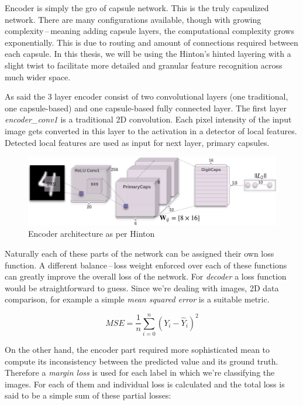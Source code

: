 Encoder is simply the gro of capsule network. This is the truly capsulized network. There are many configurations available, though with growing complexity\,--\,meaning adding capsule layers, the computational complexity grows exponentially. This is due to routing and amount of connections required between each capsule. In this thesis, we will be using the Hinton's hinted layering with a slight twist to facilitate more detailed and granular feature recognition across much wider space.

As said the 3 layer encoder consist of two convolutional layers (one traditional, one capsule-based) and one capsule-based fully connected layer. The first layer
\textit{encoder\_conv1} is a traditional 2D convolution. Each pixel intensity of the input image gets converted in this layer to the activation in a detector of local features. Detected local features are used as input for next layer, primary capsules.

\begin{figure}[ht]
    \centering
    \includegraphics[width=\textwidth]{obrazky-figures/capsulearch.png}
    \caption{Encoder architecture as per Hinton\,\cite{capsule}}
    \label{fig:encoder}
\end{figure}

Naturally each of these parts of the network can be assigned their own loss function. A different balance\,--\,loss weight enforced over each of these functions can greatly improve the overall loss of the network. For \textit{decoder} a loss function would be straightforward to guess. Since we're dealing with images, 2D data comparison, for example a simple \textit{mean squared error} is a suitable metric.

\begin{equation}
    MSE = \frac{1}{n} \sum_{i=0}^{n} (Y_{i} - \hat{Y}_{i})^2
\end{equation}

On the other hand, the encoder part required more sophisticated mean to compute its inconsistency between the predicted value and its ground truth. Therefore a \textit{margin loss} is used for each label in which we're classifying the images. For each of them and individual loss is calculated and the total loss is said to be a simple sum of these partial losses:

